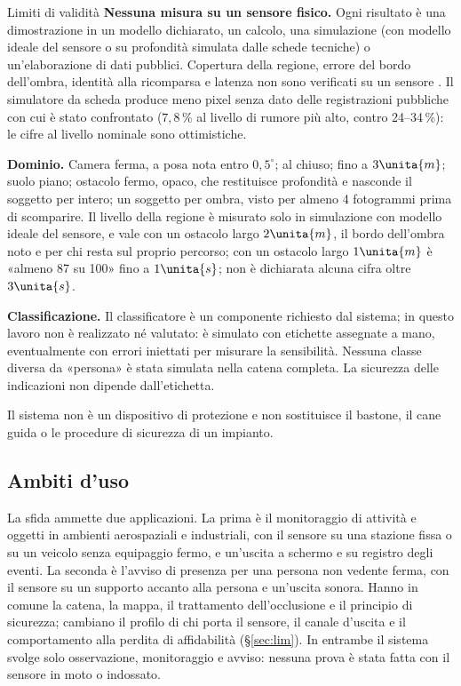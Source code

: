 \begin{riquadro}{Limiti di validità}
\textbf{Nessuna misura su un sensore fisico.} Ogni risultato è una dimostrazione in un modello dichiarato, un calcolo, una simulazione (con modello ideale del sensore o su profondità simulata dalle schede tecniche) o un'elaborazione di dati pubblici. Copertura della regione, errore del bordo dell'ombra, identità alla ricomparsa e latenza non sono verificati su un sensore . Il simulatore da scheda produce meno pixel senza dato delle registrazioni pubbliche con cui è stato confrontato ($7{,}8\,\%$ al livello di rumore più alto, contro 24--34\,\%): le cifre al livello nominale sono ottimistiche.

\textbf{Dominio.} Camera ferma, a posa nota entro $0{,}5^\circ$; al chiuso; fino a $3\unita{m}$; suolo piano; ostacolo fermo, opaco, che restituisce profondità e nasconde il soggetto per intero; un soggetto per ombra, visto per almeno 4 fotogrammi prima di scomparire. Il livello della regione è misurato solo in simulazione con modello ideale del sensore, e vale con un ostacolo largo $2\unita{m}$, il bordo dell'ombra noto e per chi resta sul proprio percorso; con un ostacolo largo $1\unita{m}$ è «almeno 87 su 100» fino a $1\unita{s}$; non è dichiarata alcuna cifra oltre $3\unita{s}$.

\textbf{Classificazione.} Il classificatore è un componente richiesto dal sistema; in questo lavoro non è realizzato né valutato: è simulato con etichette assegnate a mano, eventualmente con errori iniettati per misurare la sensibilità. Nessuna classe diversa da «persona» è stata simulata nella catena completa. La sicurezza delle indicazioni non dipende dall'etichetta.

Il sistema non è un dispositivo di protezione e non sostituisce il bastone, il cane guida o le procedure di sicurezza di un impianto.
\end{riquadro}

\subsection{Ambiti d'uso}\label{sec:intro-ambiti}

La sfida ammette due applicazioni. La prima è il monitoraggio di attività e oggetti in ambienti aerospaziali e industriali, con il sensore su una stazione fissa o su un veicolo senza equipaggio fermo, e un'uscita a schermo e su registro degli eventi. La seconda è l'avviso di presenza per una persona non vedente ferma, con il sensore su un supporto accanto alla persona e un'uscita sonora. Hanno in comune la catena, la mappa, il trattamento dell'occlusione e il principio di sicurezza; cambiano il profilo di chi porta il sensore, il canale d'uscita e il comportamento alla perdita di affidabilità (\S\ref{sec:lim}). In entrambe il sistema svolge solo osservazione, monitoraggio e avviso: nessuna prova è stata fatta con il sensore in moto o indossato.

